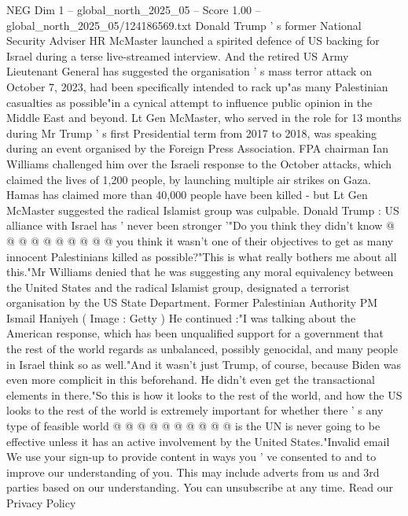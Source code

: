 \begin{textsample}{NEG Dim 1 – global\_north\_2025\_05 – Score 1.00 – global\_north\_2025\_05/124186569.txt}  \label{ex:f1_neg_231}
Donald Trump ' s former National Security Adviser HR McMaster launched a spirited defence of US backing for Israel during a terse live-streamed interview.
And the retired US Army Lieutenant General has suggested the organisation ' s mass terror attack on October 7, 2023, had been specifically intended to rack up"as many Palestinian casualties as possible"in a cynical attempt to influence public opinion in the Middle East and beyond.
Lt Gen McMaster, who served in the role for 13 months during Mr Trump ' s first Presidential term from 2017 to 2018, was speaking during an event organised by the Foreign Press Association.
FPA chairman Ian Williams challenged him over the Israeli response to the October attacks, which claimed the lives of 1,200 people, by launching multiple air strikes on Gaza.
Hamas has claimed more than 40,000 people have been killed - but Lt Gen McMaster suggested the radical Islamist group was culpable.
Donald Trump : US alliance with Israel has ' never been stronger '"Do you think they didn't know @ @ @ @ @ @ @ @ @ @ you think it wasn't one of their objectives to get as many innocent Palestinians killed as possible?"This is what really bothers me about all this."Mr Williams denied that he was suggesting any moral equivalency between the United States and the radical Islamist group, designated a terrorist organisation by the US State Department.
Former Palestinian Authority PM Ismail Haniyeh ( Image : Getty ) He continued :"I was talking about the American response, which has been unqualified support for a government that the rest of the world regards as unbalanced, possibly genocidal, and many people in Israel think so as well."And it wasn't just Trump, of course, because Biden was even more complicit in this beforehand.
He didn't even get the transactional elements in there."So this is how it looks to the rest of the world, and how the US looks to the rest of the world is extremely important for whether there ' s any type of feasible world @ @ @ @ @ @ @ @ @ @ is the UN is never going to be effective unless it has an active involvement by the United States."Invalid email We use your sign-up to provide content in ways you ' ve consented to and to improve our understanding of you.
This may include adverts from us and 3rd parties based on our understanding.
You can unsubscribe at any time.
Read our Privacy Policy

\end{textsample}
